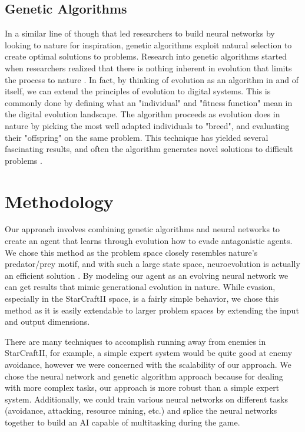 \documentclass{article}
\begin{document}
\subsection{Genetic Algorithms}
In a similar line of though that led researchers to build neural networks by
looking to nature for inspiration, genetic algorithms exploit natural selection
to create optimal solutions to problems. Research into genetic algorithms
started when researchers realized that there is nothing inherent in evolution
that limits the process to nature \cite{dejong}. In fact, by thinking of
evolution as an algorithm in and of itself, we can extend the principles of
evolution to
digital systems. This is commonly done by defining what an "individual" and
"fitness function" mean in the digital evolution landscape. The algorithm
proceeds as evolution does in nature by picking the most well adapted
individuals to "breed", and evaluating their "offspring" on the same problem.
This technique has yielded several fascinating results, and often the
algorithm generates novel solutions to difficult problems \cite{lehman}.

\section{Methodology}
Our approach involves combining genetic algorithms and neural networks to
create an agent that learns through evolution how to evade antagonistic
agents. We chose this method as the problem space closely resembles nature's
predator/prey motif, and with such a large state space, neuroevolution is
actually an efficient solution \cite{NEAT}. By modeling our agent as an
evolving neural network we can
get results that mimic generational evolution in nature. While evasion,
especially in the StarCraftII space, is a fairly simple behavior, we chose this
method as it is easily extendable to larger problem spaces by extending the
input and output dimensions.

There are many techniques to accomplish running away from enemies in
StarCraftII, for example, a simple expert system would be quite good at enemy
avoidance, however we were concerned with the scalability of our approach. We
chose the neural network and genetic algorithm approach because for dealing
with more complex tasks, our approach is more robust than a simple expert
system. Additionally, we could train various neural networks on different
tasks (avoidance, attacking, resource mining, etc.) and splice the neural
networks together to build an AI capable of multitasking during the game.
\end{document}
